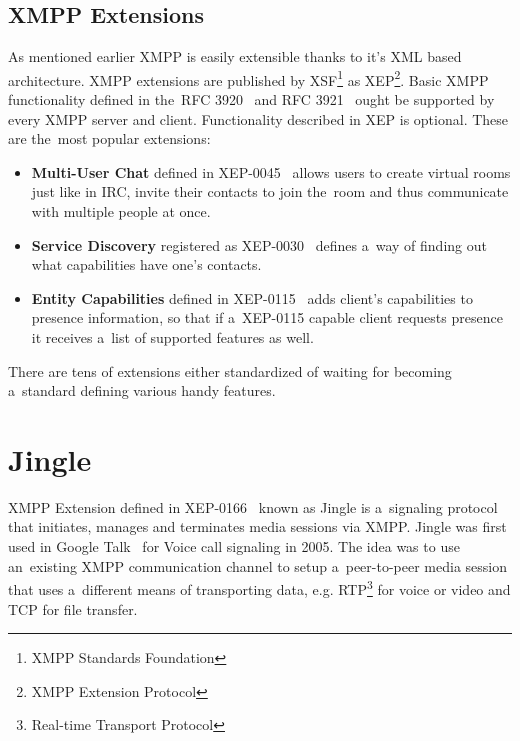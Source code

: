 \subsection*{XMPP Extensions}
As mentioned earlier XMPP is easily extensible thanks to it's XML based architecture. XMPP extensions are published by XSF\footnote{XMPP Standards Foundation} as XEP\footnote{XMPP Extension Protocol}. Basic XMPP functionality defined in the~RFC 3920~\cite{xmppCoreRFC} and RFC 3921~\cite{xmppIMRFC} ought be supported by every XMPP server and client. Functionality described in XEP is optional. These are the~most popular extensions:
\begin{itemize}
	\item{\bf Multi-User Chat} defined in XEP-0045~\cite{xepMUC} allows users to create virtual rooms just like in IRC, invite their contacts to join the~room and thus communicate with multiple people at once.
	\item{\bf Service Discovery} registered as XEP-0030~\cite{xepServiceDiscovery} defines a~way of finding out what capabilities have one's contacts.
	\item{\bf Entity Capabilities} defined in XEP-0115~\cite{xepCapabilitiesAdvertisement} adds client's capabilities to presence information, so that if a~XEP-0115 capable client requests presence it receives a~list of supported features as well.
\end{itemize}

There are tens of extensions either standardized of waiting for becoming a~standard defining various handy features.

\section{Jingle}
XMPP Extension defined in XEP-0166~\cite{xepJignle} known as Jingle is a~signaling protocol that initiates, manages and terminates media sessions via XMPP. Jingle was first used in Google Talk~\cite{googleTalk} for Voice call signaling in 2005. The idea was to use an~existing XMPP communication channel to setup a~peer-to-peer media session that uses a~different means of transporting data, e.g. RTP\footnote{Real-time Transport Protocol} for voice or video and TCP for file transfer. 


